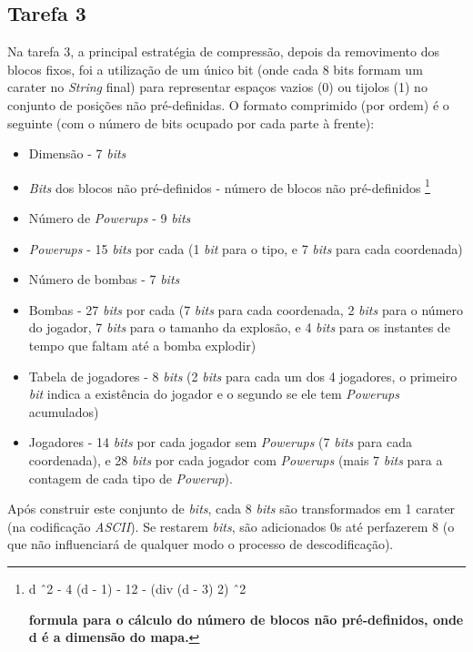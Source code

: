 \documentclass[a4paper]{report}
\begin{document}
\subsection{Tarefa 3}
Na tarefa 3, a principal estratégia de compressão, depois da removimento dos blocos fixos, foi a utilização de um único bit (onde cada 8 bits formam um carater no \textit{String} final) para representar espaços vazios (0) ou tijolos (1) no conjunto de posições não pré-definidas. O formato comprimido (por ordem) é o seguinte (com o número de bits ocupado por cada parte à frente):

\begin{itemize}
\item Dimensão - 7 \textit{bits}
\item \textit{Bits} dos blocos não pré-definidos - número de blocos não pré-definidos \footnote{d \^\ 2 - 4 \* (d - 1) - 12 - (div (d - 3) 2) \^\ 2

\textbf{formula para o cálculo do número de blocos não pré-definidos, onde d é a dimensão do mapa.}}
\item Número de \textit{Powerups} - 9 \textit{bits}
\item \textit{Powerups} - 15 \textit{bits} por cada (1 \textit{bit} para o tipo, e 7 \textit{bits} para cada coordenada)
\item Número de bombas - 7 \textit{bits}
\item Bombas - 27 \textit{bits} por cada (7 \textit{bits} para cada coordenada, 2 \textit{bits} para o número do jogador, 7 \textit{bits} para o tamanho da explosão, e 4 \textit{bits} para os instantes de tempo que faltam até a bomba explodir)
\item Tabela de jogadores - 8 \textit{bits} (2 \textit{bits} para cada um dos 4 jogadores, o primeiro \textit{bit} indica a existência do jogador e o segundo se ele tem \textit{Powerups} acumulados)
\item Jogadores - 14 \textit{bits} por cada jogador sem \textit{Powerups} (7 \textit{bits} para cada coordenada), e 28 \textit{bits} por cada jogador com \textit{Powerups} (mais 7 \textit{bits} para a contagem de cada tipo de \textit{Powerup}).
\end{itemize}

Após construir este conjunto de \textit{bits}, cada 8 \textit{bits} são transformados em 1 carater (na codificação \textit{ASCII}). Se restarem \textit{bits}, são adicionados 0s até perfazerem 8 (o que não influenciará de qualquer modo o processo de descodificação).
\end{document}
